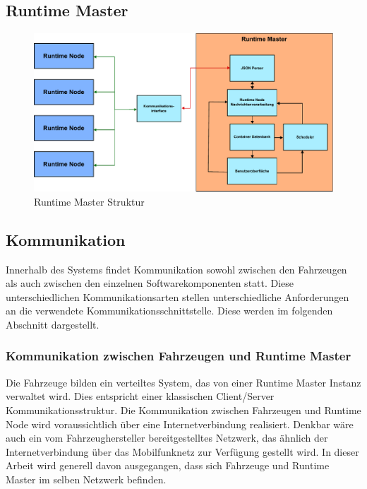 \subsection{Runtime Master}

\begin{figure}[htbp]
	\centering
	\includegraphics[width=\textwidth]{./content/graphics/Runtime_Master_Arch.pdf}
	\caption{Runtime Master Struktur}
	\label{runtime master}
\end{figure}

\subsection{Kommunikation}

Innerhalb des Systems findet Kommunikation sowohl zwischen den Fahrzeugen als auch zwischen den einzelnen Softwarekomponenten statt. Diese unterschiedlichen Kommunikationsarten stellen unterschiedliche Anforderungen an die verwendete Kommunikationsschnittstelle. Diese werden im folgenden Abschnitt dargestellt.

\subsubsection{Kommunikation zwischen Fahrzeugen und Runtime Master}

Die Fahrzeuge bilden ein verteiltes System, das von einer Runtime Master Instanz verwaltet wird. Dies entspricht einer klassischen Client/Server Kommunikationsstruktur. Die Kommunikation zwischen Fahrzeugen und Runtime Node wird voraussichtlich über eine Internetverbindung realisiert. Denkbar wäre auch ein vom Fahrzeughersteller bereitgestelltes Netzwerk, das ähnlich der Internetverbindung über das Mobilfunknetz zur Verfügung gestellt wird. In dieser Arbeit wird generell davon ausgegangen, dass sich Fahrzeuge und Runtime Master im selben Netzwerk befinden. 

